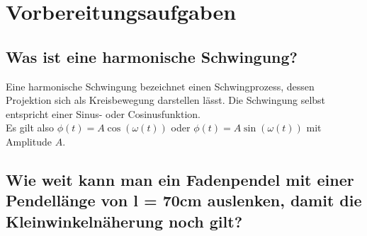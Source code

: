 \section{Vorbereitungsaufgaben}
\subsection{Was ist eine harmonische Schwingung?}
Eine harmonische Schwingung bezeichnet einen Schwingprozess, dessen Projektion sich als Kreisbewegung darstellen lässt. Die Schwingung selbst entspricht einer Sinus- oder Cosinusfunktion. \\

\noindent Es gilt also $\phi(t)=A\cos(\omega(t))$ oder $\phi(t)= A\sin(\omega(t))$ mit Amplitude $A$.
\subsection{Wie weit kann man ein Fadenpendel mit einer Pendellänge von l = 70cm auslenken, damit die Kleinwinkelnäherung noch gilt?}
\label{sec:Vorbereitungsaufgaben}